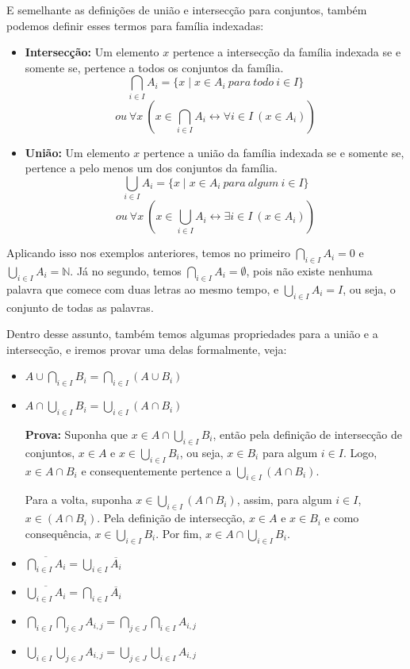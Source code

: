 E semelhante as definições de união e intersecção para conjuntos, também podemos definir esses termos para família indexadas:

\begin{itemize}
  \item \textbf{Intersecção:} Um elemento $x$ pertence a intersecção da família indexada se e somente se, pertence a todos os conjuntos da família.
  \[\bigcap_{i\in I} A_i = \{x \mid x \in A_i\ para\ todo\ i\in I\}\]
  \[ou\ \forall x\ (x \in \bigcap_{i \in I} A_i \leftrightarrow \forall i \in I\ (x \in A_i))\]
  \item \textbf{União:} Um elemento $x$ pertence a união da família indexada se e somente se, pertence a pelo menos um dos conjuntos da família.
  \[\bigcup_{i\in I} A_i = \{x \mid x \in A_i\ para\ algum\ i\in I\}\]
  \[ou\ \forall x\ (x \in \bigcup_{i \in I} A_i \leftrightarrow \exists i \in I\ (x \in A_i))\]
\end{itemize}

Aplicando isso nos exemplos anteriores, temos no primeiro $\bigcap_{i \in I} A_i = {0}$ e $\bigcup_{i \in I} A_i = \mathbb{N}$. Já no segundo, temos $\bigcap_{i \in I} A_i = \emptyset$, pois não existe nenhuma palavra que comece com duas letras ao mesmo tempo, e $\bigcup_{i \in I} A_i = I$, ou seja, o conjunto de todas as palavras.

Dentro desse assunto, também temos algumas propriedades para a união e a intersecção, e iremos provar uma delas formalmente, veja:

\begin{itemize}
  \item $A \cup \bigcap_{i \in I} B_i = \bigcap_{i \in I} (A \cup B_i)$
  \item $A \cap \bigcup_{i \in I} B_i = \bigcup_{i \in I} (A \cap B_i)$
  
  \textbf{Prova:} Suponha que $x \in A \cap \bigcup_{i \in I} B_i$, então pela definição de intersecção de conjuntos, $x \in A$ e $x \in \bigcup_{i \in I} B_i$, ou seja, $x \in B_i$ para algum $i \in I$. Logo, $x \in A \cap B_i$ e consequentemente pertence a $\bigcup_{i \in I}(A \cap B_i)$.
  
  Para a volta, suponha $x \in \bigcup_{i \in I} (A \cap B_i)$, assim, para algum $i \in I$, $x \in (A \cap B_i)$. Pela definição de intersecção, $x \in A$ e $x \in B_i$ e como consequência, $x \in \bigcup_{i \in I} B_i$. Por fim, $x \in A \cap \bigcup_{i \in I} B_i$.
    
  \item $\overline{\bigcap_{i \in I} A_i} = \bigcup_{i \in I} \overline{A_i}$
  \item $\overline{\bigcup_{i \in I} A_i} = \bigcap_{i \in I} \overline{A_i}$
  \item $\bigcap_{i \in I} \bigcap_{j \in J} A_{i,j} = \bigcap_{j \in J} \bigcap_{i \in I} A_{i,j}$
  \item $\bigcup_{i \in I} \bigcup_{j \in J} A_{i,j} = \bigcup_{j \in J} \bigcup_{i \in I} A_{i,j}$
\end{itemize}

